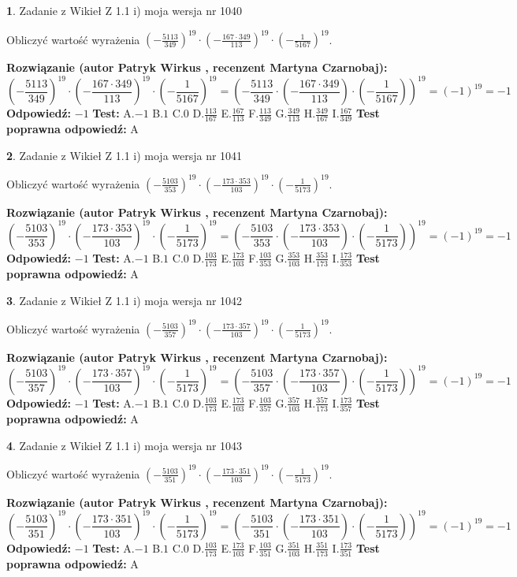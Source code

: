 \documentclass[12pt, a4paper]{article}
\theoremstyle{definition} %
\newtheorem{zad}{}
\newcommand{\zadStart}[1]{\begin{zad}#1\newline}
\newcommand{\zadStop}{\end{zad}}
\newcommand{\rozwStart}[2]{\noindent \textbf{Rozwiązanie (autor #1 , recenzent #2): }\newline}
\newcommand{\rozwStop}{\newline}
\newcommand{\odpStart}{\noindent \textbf{Odpowiedź:}\newline}
\newcommand{\odpStop}{\newline}
\newcommand{\testStart}{\noindent \textbf{Test:}\newline}
\newcommand{\testStop}{\newline}
\newcommand{\kluczStart}{\noindent \textbf{Test poprawna odpowiedź:}\newline}
\newcommand{\kluczStop}{\newline}
\begin{document}
\zadStart{Zadanie z Wikieł Z 1.1 i) moja wersja nr 1040}

Obliczyć wartość wyrażenia $(-\frac{5113}{349})^{19} \cdot (-\frac{167 \cdot 349}{113})^{19} \cdot (-\frac{1}{5167})^{19}$.
\zadStop
\rozwStart{Patryk Wirkus}{Martyna Czarnobaj}
$$(-\frac{5113}{349})^{19} \cdot (-\frac{167 \cdot 349}{113})^{19} \cdot (-\frac{1}{5167})^{19} = (-\frac{5113}{349} \cdot (-\frac{167 \cdot 349}{113}) \cdot (-\frac{1}{5167}))^{19} = (-1)^{19} = -1$$
\rozwStop
\odpStart
$-1$
\odpStop
\testStart
A.$-1$ B.$1$ C.$0$ D.$\frac{113}{167}$ E.$\frac{167}{113}$
F.$\frac{113}{349}$ G.$\frac{349}{113}$
H.$\frac{349}{167}$
I.$\frac{167}{349}$
\testStop
\kluczStart
A
\kluczStop



\zadStart{Zadanie z Wikieł Z 1.1 i) moja wersja nr 1041}

Obliczyć wartość wyrażenia $(-\frac{5103}{353})^{19} \cdot (-\frac{173 \cdot 353}{103})^{19} \cdot (-\frac{1}{5173})^{19}$.
\zadStop
\rozwStart{Patryk Wirkus}{Martyna Czarnobaj}
$$(-\frac{5103}{353})^{19} \cdot (-\frac{173 \cdot 353}{103})^{19} \cdot (-\frac{1}{5173})^{19} = (-\frac{5103}{353} \cdot (-\frac{173 \cdot 353}{103}) \cdot (-\frac{1}{5173}))^{19} = (-1)^{19} = -1$$
\rozwStop
\odpStart
$-1$
\odpStop
\testStart
A.$-1$ B.$1$ C.$0$ D.$\frac{103}{173}$ E.$\frac{173}{103}$
F.$\frac{103}{353}$ G.$\frac{353}{103}$
H.$\frac{353}{173}$
I.$\frac{173}{353}$
\testStop
\kluczStart
A
\kluczStop



\zadStart{Zadanie z Wikieł Z 1.1 i) moja wersja nr 1042}

Obliczyć wartość wyrażenia $(-\frac{5103}{357})^{19} \cdot (-\frac{173 \cdot 357}{103})^{19} \cdot (-\frac{1}{5173})^{19}$.
\zadStop
\rozwStart{Patryk Wirkus}{Martyna Czarnobaj}
$$(-\frac{5103}{357})^{19} \cdot (-\frac{173 \cdot 357}{103})^{19} \cdot (-\frac{1}{5173})^{19} = (-\frac{5103}{357} \cdot (-\frac{173 \cdot 357}{103}) \cdot (-\frac{1}{5173}))^{19} = (-1)^{19} = -1$$
\rozwStop
\odpStart
$-1$
\odpStop
\testStart
A.$-1$ B.$1$ C.$0$ D.$\frac{103}{173}$ E.$\frac{173}{103}$
F.$\frac{103}{357}$ G.$\frac{357}{103}$
H.$\frac{357}{173}$
I.$\frac{173}{357}$
\testStop
\kluczStart
A
\kluczStop



\zadStart{Zadanie z Wikieł Z 1.1 i) moja wersja nr 1043}

Obliczyć wartość wyrażenia $(-\frac{5103}{351})^{19} \cdot (-\frac{173 \cdot 351}{103})^{19} \cdot (-\frac{1}{5173})^{19}$.
\zadStop
\rozwStart{Patryk Wirkus}{Martyna Czarnobaj}
$$(-\frac{5103}{351})^{19} \cdot (-\frac{173 \cdot 351}{103})^{19} \cdot (-\frac{1}{5173})^{19} = (-\frac{5103}{351} \cdot (-\frac{173 \cdot 351}{103}) \cdot (-\frac{1}{5173}))^{19} = (-1)^{19} = -1$$
\rozwStop
\odpStart
$-1$
\odpStop
\testStart
A.$-1$ B.$1$ C.$0$ D.$\frac{103}{173}$ E.$\frac{173}{103}$
F.$\frac{103}{351}$ G.$\frac{351}{103}$
H.$\frac{351}{173}$
I.$\frac{173}{351}$
\testStop
\kluczStart
A
\kluczStop
\end{document}
